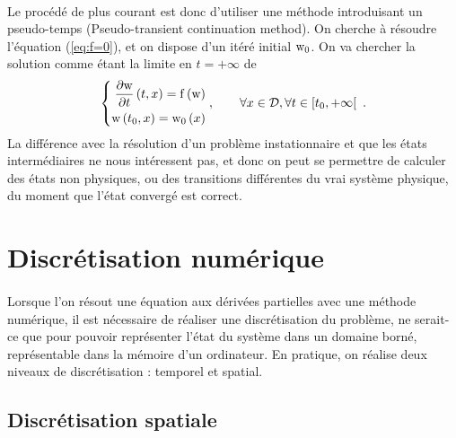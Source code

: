 		\paragraph{}
		Le procédé de plus courant est donc d'utiliser une méthode introduisant un pseudo-temps (Pseudo-transient continuation method).
		On cherche à résoudre l'équation (\ref{eq:f=0}), et on dispose d'un itéré initial $\textup{w}_0$.
		On va chercher la solution comme étant la limite en $t = +\infty$ de
		\begin{equation}\label{eq:edp}
			\left\{\begin{aligned}
				\frac{\partial\textup{w}}{\partial t}\left(t, x\right) = \operatorname{f}\left(\textup{w}\right) \\
				\textup{w}\left(t_0, x\right) = \textup{w}_0\left(x\right)
			\end{aligned}\right.,\qquad \forall x\in\mathcal{D}, \forall t\in\left[t_0, +\infty\right[\ .
		\end{equation}
		La différence avec la résolution d'un problème instationnaire et que les états intermédiaires ne nous intéressent pas, et donc on peut se permettre de calculer des états non physiques, ou des transitions différentes du vrai système physique, du moment que l'état convergé est correct.


\section{Discrétisation numérique}

	\paragraph{}
	Lorsque l'on résout une équation aux dérivées partielles avec une méthode numérique, il est nécessaire de réaliser une discrétisation du problème, ne serait-ce que pour pouvoir représenter l'état du système dans un domaine borné, représentable dans la mémoire d'un ordinateur.
	En pratique, on réalise deux niveaux de discrétisation : temporel et spatial.


	\subsection{Discrétisation spatiale}

